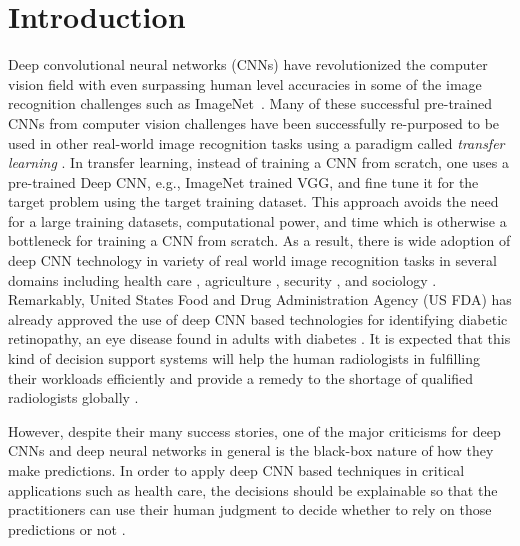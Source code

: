 \section{Introduction}
Deep convolutional neural networks (CNNs) \cite{alexnet, vggnet, resnet, inception} have revolutionized the computer vision field with even surpassing human level accuracies in some of the image recognition challenges such as ImageNet~\cite{imagenet}.
Many of these successful pre-trained CNNs from computer vision challenges have been successfully re-purposed to be used in other real-world image recognition tasks using a paradigm called \textit{transfer learning} \cite{transfer-learning-factors}.
In transfer learning, instead of training a CNN from scratch, one uses a pre-trained Deep CNN, e.g., ImageNet trained VGG, and fine tune it for the target problem using the target training dataset.
This approach avoids the need for a large training datasets, computational power, and time which is otherwise a bottleneck for training a CNN from scratch.
As a result, there is wide adoption of deep CNN technology in variety of real world image recognition tasks in several domains including health care \cite{kermany2018identifying, islam2017abnormality}, agriculture \cite{mohanty2016using}, security \cite{arbabzadah2016identifying}, and sociology \cite{wang2017deep}.
Remarkably, United States Food and Drug Administration Agency (US FDA) has already approved the use of deep CNN based technologies for identifying diabetic retinopathy, an eye disease found in adults with diabetes \cite{fdaretinopathy}.
It is expected that this kind of decision support systems will help the human radiologists in fulfilling their workloads efficiently and provide a remedy to the shortage of qualified radiologists globally \cite{radiologistshortage}.

However, despite their many success stories, one of the major criticisms for deep CNNs and deep neural networks in general is the black-box nature of how they make predictions.
In order to apply deep CNN based techniques in critical applications such as health care, the decisions should be explainable so that the practitioners can use their human judgment to decide whether to rely on those predictions or not \cite{jung2017deep}.

